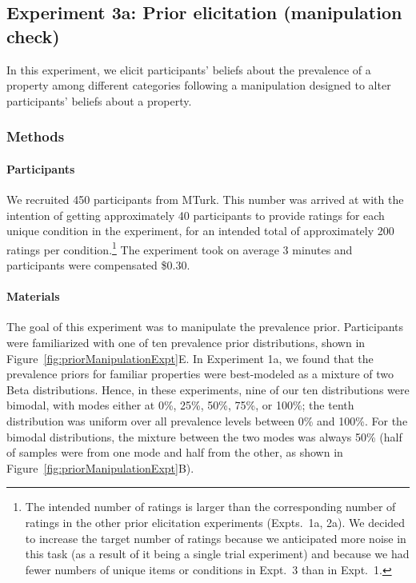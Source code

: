 \documentclass[floatsintext,doc]{apa6}
\let\oldparagraph\paragraph
\renewcommand{\paragraph}[1]{\oldparagraph{#1}\mbox{}}
\let\rmarkdownfootnote\footnote%
\def\footnote{\protect\rmarkdownfootnote}
\begin{document}
\hypertarget{experiment-3a-prior-elicitation-manipulation-check}{%
\subsection{Experiment 3a: Prior elicitation (manipulation check)}\label{experiment-3a-prior-elicitation-manipulation-check}}

In this experiment, we elicit participants' beliefs about the prevalence of a property among different categories following a manipulation designed to alter participants' beliefs about a property.


\hypertarget{methods-2}{%
\subsubsection{Methods}\label{methods-2}}

\hypertarget{participants-3}{%
\paragraph{Participants}\label{participants-3}}
%
We recruited 450 participants from MTurk.
This number was arrived at with the intention of getting approximately 40 participants to provide ratings for each unique condition in the experiment, for an intended total of approximately 200 ratings per condition.\footnote{The intended number of ratings is larger than the corresponding number of ratings in the other prior elicitation experiments (Expts.~1a, 2a). We decided to increase the target number of ratings because we anticipated more noise in this task (as a result of it being a single trial experiment) and because we had fewer numbers of unique items or conditions in Expt.~3 than in Expt.~1.}
The experiment took on average 3 minutes and participants were compensated \$0.30.

\hypertarget{materials-1}{%
\paragraph{Materials}\label{materials-1}}
%
The goal of this experiment was to manipulate the prevalence prior.
Participants were familiarized with one of ten prevalence prior distributions, shown in Figure~\ref{fig:priorManipulationExpt}E.
In Experiment 1a, we found that the prevalence priors for familiar properties were best-modeled as a mixture of two Beta distributions.
Hence, in these experiments, nine of our ten distributions were bimodal, with modes either at 0\%, 25\%, 50\%, 75\%, or 100\%; the tenth distribution was uniform over all prevalence levels between 0\% and 100\%.
For the bimodal distributions, the mixture between the two modes was always 50\% (half of samples were from one mode and half from the other, as shown in Figure~\ref{fig:priorManipulationExpt}B).
\end{document}
